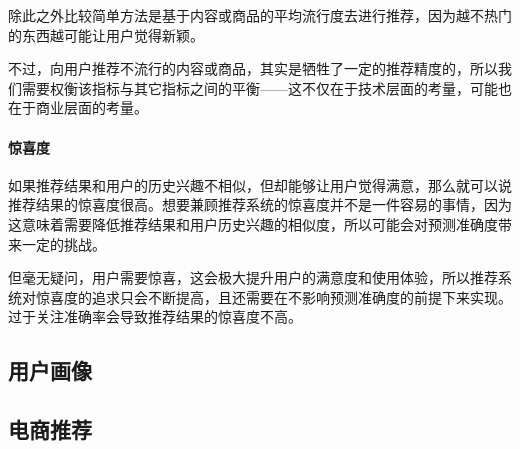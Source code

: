 除此之外比较简单方法是基于内容或商品的平均流行度去进行推荐，因为越不热门的东西越可能让用户觉得新颖。

不过，向用户推荐不流行的内容或商品，其实是牺牲了一定的推荐精度的，所以我们需要权衡该指标与其它指标之间的平衡——这不仅在于技术层面的考量，可能也在于商业层面的考量。

\paragraph{惊喜度}如果推荐结果和用户的历史兴趣不相似，但却能够让用户觉得满意，那么就可以说推荐结果的惊喜度很高。想要兼顾推荐系统的惊喜度并不是一件容易的事情，因为这意味着需要降低推荐结果和用户历史兴趣的相似度，所以可能会对预测准确度带来一定的挑战。

但毫无疑问，用户需要惊喜，这会极大提升用户的满意度和使用体验，所以推荐系统对惊喜度的追求只会不断提高，且还需要在不影响预测准确度的前提下来实现。过于关注准确率会导致推荐结果的惊喜度不高。


\subsection{用户画像}

\subsection{电商推荐}